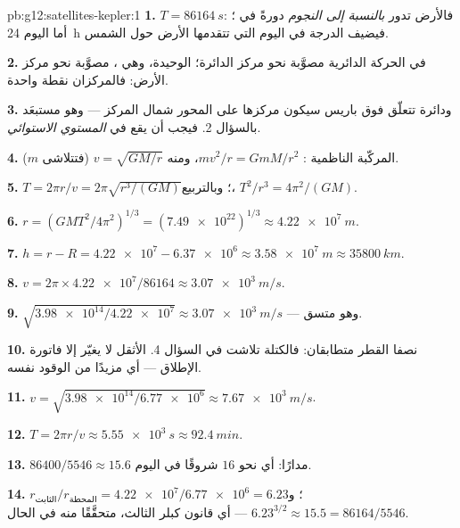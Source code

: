 \begin{solution}{pb:g12:satellites-kepler:1}
\textbf{1.} $T = \qty{86164}{s}$: فالأرض تدور
\emph{بالنسبة إلى النجوم} دورةً في ؛ أما اليوم \qty{24}{h}
فيضيف الدرجة في اليوم التي تتقدمها الأرض حول الشمس.

\textbf{2.}  في الحركة الدائرية مصوَّبة نحو مركز
الدائرة؛  الوحيدة، وهي ، مصوَّبة نحو مركز الأرض: فالمركزان
نقطة واحدة.

\textbf{3.} ودائرة تتعلّق فوق باريس سيكون مركزها على المحور
شمال المركز --- وهو مستبعَد بالسؤال 2. فيجب أن يقع  في
\emph{المستوي الاستوائي}.

\textbf{4.} المركّبة الناظمية :
$m v^2/r = GmM/r^2$، ومنه $v = \sqrt{GM/r}$ (فتتلاشى $m$).

\textbf{5.} $T = 2\pi r/v = 2\pi\sqrt{r^3/(GM)}$؛ وبالتربيع،
$T^2/r^3 = 4\pi^2/(GM)$.

\textbf{6.} $r = \left(GMT^2/4\pi^2\right)^{1/3} =
(\num{7.49e22})^{1/3} \approx \qty{4.22e7}{m}$.

\textbf{7.} $h = r - R = \num{4.22e7} - \num{6.37e6} \approx
\qty{3.58e7}{m} \approx \qty{35800}{km}$.

\textbf{8.} $v = 2\pi \times \num{4.22e7}/\num{86164} \approx
\qty{3.07e3}{m/s}$.

\textbf{9.} $\sqrt{\num{3.98e14}/\num{4.22e7}} \approx
\qty{3.07e3}{m/s}$ --- وهو متسق.

\textbf{10.} نصفا القطر متطابقان: فالكتلة تلاشت في السؤال 4. 
الأثقل لا يغيّر إلا فاتورة الإطلاق --- أي مزيدًا من الوقود  نفسه.

\textbf{11.} $v = \sqrt{\num{3.98e14}/\num{6.77e6}} \approx
\qty{7.67e3}{m/s}$.

\textbf{12.} $T = 2\pi r/v \approx \qty{5.55e3}{s} \approx
\qty{92.4}{min}$.

\textbf{13.} $\num{86400}/5546 \approx 15.6$ مدارًا: أي نحو $16$
شروقًا في اليوم.

\textbf{14.} $r_{\text{الثابت}}/r_{\text{المحطة}} = \num{4.22e7}/\num{6.77e6}
= 6.23$؛ و$6.23^{3/2} \approx 15.5 = \num{86164}/5546$ --- أي قانون كبلر
الثالث، متحقَّقًا منه في الحال.


\end{solution}
